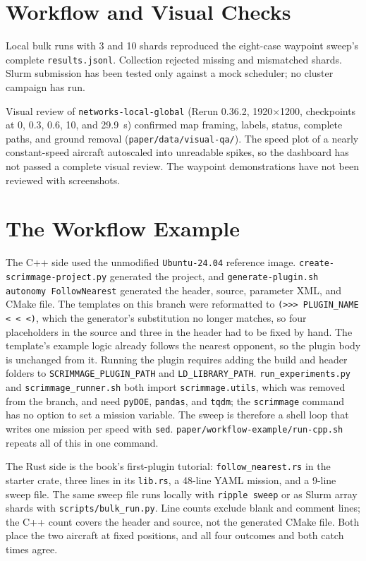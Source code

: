 \documentclass[conference]{IEEEtran}
\begin{document}

\section{Workflow and Visual Checks}
\label{app:workflow}

Local bulk runs with 3 and 10 shards reproduced the eight-case waypoint sweep's
complete \texttt{results.jsonl}. Collection rejected missing and mismatched
shards. Slurm submission has been tested only against a mock scheduler; no
cluster campaign has run.

Visual review of \texttt{networks-local-global} (Rerun 0.36.2, 1920$\times$1200,
checkpoints at 0, 0.3, 0.6, 10, and 29.9~s) confirmed map framing, labels,
status, complete paths, and ground removal
(\texttt{paper/data/visual-qa/}). The speed plot of a nearly constant-speed
aircraft autoscaled into unreadable spikes, so the dashboard has not passed a
complete visual review. The waypoint demonstrations have not been reviewed with
screenshots.

\section{The Workflow Example}
\label{app:workflow}

The C++ side used the unmodified \texttt{Ubuntu-24.04} reference image.
\texttt{create-scrimmage-project.py} generated the project, and
\texttt{generate-plugin.sh autonomy FollowNearest} generated the header,
source, parameter XML, and CMake file. The templates on this branch were
reformatted to \texttt{(>{}>{}> PLUGIN\_NAME < < <)}, which the generator's
substitution no longer matches, so four placeholders in the source and three in
the header had to be fixed by hand. The template's example logic already
follows the nearest opponent, so the plugin body is unchanged from it. Running
the plugin requires adding the build and header folders to
\texttt{SCRIMMAGE\_PLUGIN\_PATH} and \texttt{LD\_LIBRARY\_PATH}.
\texttt{run\_experiments.py} and \texttt{scrimmage\_runner.sh} both import
\texttt{scrimmage.utils}, which was removed from the branch, and need
\texttt{pyDOE}, \texttt{pandas}, and \texttt{tqdm}; the \texttt{scrimmage}
command has no option to set a mission variable. The sweep is therefore a
shell loop that writes one mission per speed with \texttt{sed}.
\texttt{paper/workflow-example/run-cpp.sh} repeats all of this in one command.

The Rust side is the book's first-plugin tutorial: \texttt{follow\_nearest.rs}
in the starter crate, three lines in its \texttt{lib.rs}, a 48-line YAML
mission, and a 9-line sweep file. The same sweep file runs locally with
\texttt{ripple sweep} or as Slurm array shards with
\texttt{scripts/bulk\_run.py}. Line counts exclude blank and comment lines;
the C++ count covers the header and source, not the generated CMake file.
Both place the two aircraft at fixed positions, and all four outcomes and
both catch times agree.
\end{document}
